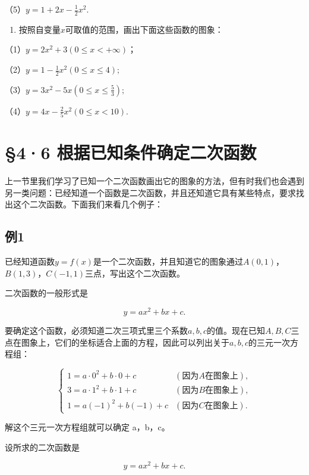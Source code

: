 （5）\(y = 1 + 2x - \frac{1}{2} x^2.\)

\begin{enumerate}[start=2]
\item
  按照自变量\(x\)可取值的范围，画出下面这些函数的图象：
\end{enumerate}

（1）\(y = 2x^{2} + 3 (0 \leqslant x < +\infty)\)；

（2）\(y = 1 - \frac{1}{2} x^2 (0 \leqslant x \leqslant 4);\)

（3）\(y = 3x^{2} - 5x\left(0 \leqslant x \leqslant \frac{5}{3}\right);\)

（4）\(y = 4x - \frac{2}{5} x^2 (0 \leqslant x < 10).\)

\section{§4·6 根据已知条件确定二次函数}

上一节里我们学习了已知一个二次函数画出它的图象的方法，但有时我们也会遇到另一类问题：已经知道一个函数是二次函数，并且还知道它具有某些特点，要求找出这个二次函数。下面我们来看几个例子：

\subsection{例1}

已经知道函数\(y=f(x)\)是一个二次函数，并且知道它的图象通过\(A(0,1)\)，\(B(1,3)\)，\(C(-1,1)\)三点，写出这个二次函数。

 二次函数的一般形式是

\[
y = a x^{2} + b x + c.
\]

要确定这个函数，必须知道二次三项式里三个系数\(a, b, c\)的值。现在已知\(A, B, C\)三点在图象上，它们的坐标适合上面的方程，因此可以列出关于\(a, b, c\)的三元一次方程组：

\[
\left\{ \begin{array}{ll} 1 = a \cdot 0^{2} + b \cdot 0 + c & (\text{因为} A \text{在图象上}), \\ 3 = a \cdot 1^{2} + b \cdot 1 + c & (\text{因为} B \text{在图象上}), \\ 1 = a (- 1)^{2} + b (- 1) + c & (\text{因为} C \text{在图象上}). \end{array} \right.
\]

解这个三元一次方程组就可以确定 a，b，c。

 设所求的二次函数是

\[
y = a x^{2} + b x + c. \tag {1}
\]

